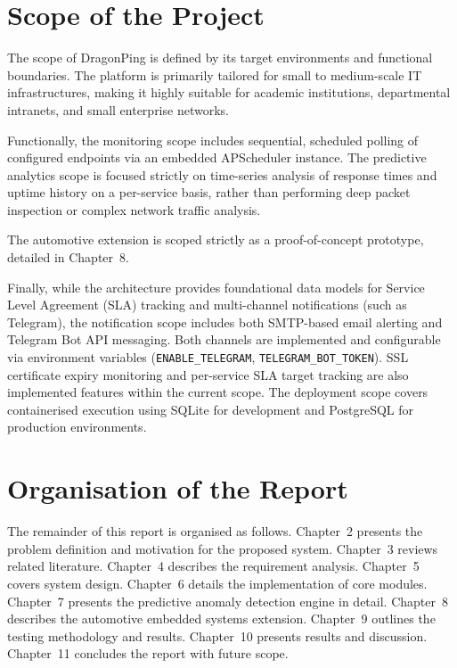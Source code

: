 \documentclass[12pt,a4paper,oneside]{report}
\begin{document}
\section{Scope of the Project}
\noindent The scope of DragonPing is defined by its target environments and functional boundaries. The platform is primarily tailored for small to medium-scale IT infrastructures, making it highly suitable for academic institutions, departmental intranets, and small enterprise networks. 

\noindent Functionally, the monitoring scope includes sequential, scheduled polling of configured endpoints via an embedded APScheduler instance. The predictive analytics scope is focused strictly on time-series analysis of response times and uptime history on a per-service basis, rather than performing deep packet inspection or complex network traffic analysis. 

\noindent The automotive extension is scoped strictly as a proof-of-concept prototype, detailed in Chapter~8.

\noindent Finally, while the architecture provides foundational data models for Service Level Agreement (SLA) tracking and multi-channel notifications (such as Telegram), the notification scope includes both SMTP-based email alerting and Telegram Bot API messaging. Both channels are implemented and configurable via environment variables (\texttt{ENABLE\_TELEGRAM}, \texttt{TELEGRAM\_BOT\_TOKEN}). SSL certificate expiry monitoring and per-service SLA target tracking are also implemented features within the current scope. The deployment scope covers containerised execution using SQLite for development and PostgreSQL for production environments.

\section{Organisation of the Report}
\noindent The remainder of this report is organised as follows. Chapter~2 presents the problem definition and motivation for the proposed system. Chapter~3 reviews related literature. Chapter~4 describes the requirement analysis. Chapter~5 covers system design. Chapter~6 details the implementation of core modules. Chapter~7 presents the predictive anomaly detection engine in detail. Chapter~8 describes the automotive embedded systems extension. Chapter~9 outlines the testing methodology and results. Chapter~10 presents results and discussion. Chapter~11 concludes the report with future scope.
\end{document}
